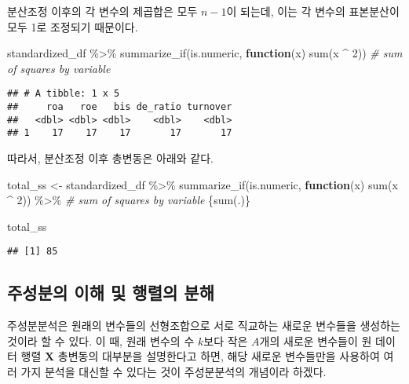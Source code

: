 \documentclass[
]{book}
\newenvironment{Shaded}{\begin{snugshade}}{\end{snugshade}}
\newcommand{\CommentTok}[1]{\textcolor[rgb]{0.56,0.35,0.01}{\textit{#1}}}
\newcommand{\ControlFlowTok}[1]{\textcolor[rgb]{0.13,0.29,0.53}{\textbf{#1}}}
\newcommand{\DecValTok}[1]{\textcolor[rgb]{0.00,0.00,0.81}{#1}}
\newcommand{\FunctionTok}[1]{\textcolor[rgb]{0.00,0.00,0.00}{#1}}
\newcommand{\NormalTok}[1]{#1}
\newcommand{\OtherTok}[1]{\textcolor[rgb]{0.56,0.35,0.01}{#1}}
\newcommand{\SpecialCharTok}[1]{\textcolor[rgb]{0.00,0.00,0.00}{#1}}
\begin{document}
분산조정 이후의 각 변수의 제곱합은 모두 \(n - 1\)이 되는데, 이는 각 변수의 표본분산이 모두 1로 조정되기 때문이다.

\begin{Shaded}
\begin{Highlighting}[]
\NormalTok{standardized\_df }\SpecialCharTok{\%\textgreater{}\%}
  \FunctionTok{summarize\_if}\NormalTok{(is.numeric, }\ControlFlowTok{function}\NormalTok{(x) }\FunctionTok{sum}\NormalTok{(x }\SpecialCharTok{\^{}} \DecValTok{2}\NormalTok{)) }\CommentTok{\# sum of squares by variable}
\end{Highlighting}
\end{Shaded}

\begin{verbatim}
## # A tibble: 1 x 5
##     roa   roe   bis de_ratio turnover
##   <dbl> <dbl> <dbl>    <dbl>    <dbl>
## 1    17    17    17       17       17
\end{verbatim}

따라서, 분산조정 이후 총변동은 아래와 같다.

\begin{Shaded}
\begin{Highlighting}[]
\NormalTok{total\_ss }\OtherTok{\textless{}{-}}\NormalTok{ standardized\_df }\SpecialCharTok{\%\textgreater{}\%} 
  \FunctionTok{summarize\_if}\NormalTok{(is.numeric, }\ControlFlowTok{function}\NormalTok{(x) }\FunctionTok{sum}\NormalTok{(x }\SpecialCharTok{\^{}} \DecValTok{2}\NormalTok{)) }\SpecialCharTok{\%\textgreater{}\%} \CommentTok{\# sum of squares by variable}
\NormalTok{  \{}\FunctionTok{sum}\NormalTok{(.)\}}

\NormalTok{total\_ss}
\end{Highlighting}
\end{Shaded}

\begin{verbatim}
## [1] 85
\end{verbatim}

\hypertarget{pca-intro}{%
\subsection{주성분의 이해 및 행렬의 분해}\label{pca-intro}}

주성분분석은 원래의 변수들의 선형조합으로 서로 직교하는 새로운 변수들을 생성하는 것이라 할 수 있다. 이 때, 원래 변수의 수 \(k\)보다 작은 \(A\)개의 새로운 변수들이 원 데이터 행렬 \(\mathbf{X}\) 총변동의 대부분을 설명한다고 하면, 해당 새로운 변수들만을 사용하여 여러 가지 분석을 대신할 수 있다는 것이 주성분분석의 개념이라 하겠다.
\end{document}

